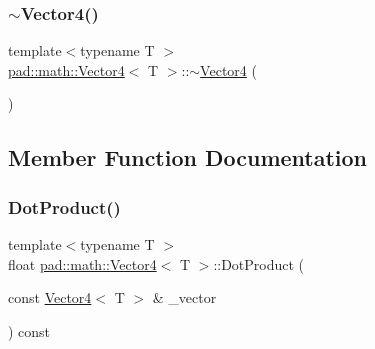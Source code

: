 \mbox{\label{structpad_1_1math_1_1_vector4_adf02f843943a3524de2add168b4d4903}} 
\subsubsection{\texorpdfstring{$\sim$\+Vector4()}{~Vector4()}}
{\footnotesize\ttfamily template$<$typename T $>$ \\
\mbox{\hyperlink{structpad_1_1math_1_1_vector4}{pad\+::math\+::\+Vector4}}$<$ T $>$\+::$\sim$\mbox{\hyperlink{structpad_1_1math_1_1_vector4}{Vector4}} (\begin{DoxyParamCaption}{ }\end{DoxyParamCaption})\hspace{0.3cm}{\ttfamily [default]}}



\subsection{Member Function Documentation}
\mbox{\label{structpad_1_1math_1_1_vector4_aa2bc23659e5331ea63c4135ff4ba0cc5}} 
\subsubsection{\texorpdfstring{Dot\+Product()}{DotProduct()}}
{\footnotesize\ttfamily template$<$typename T $>$ \\
float \mbox{\hyperlink{structpad_1_1math_1_1_vector4}{pad\+::math\+::\+Vector4}}$<$ T $>$\+::Dot\+Product (\begin{DoxyParamCaption}\item[{const \mbox{\hyperlink{structpad_1_1math_1_1_vector4}{Vector4}}$<$ T $>$ \&}]{\+\_\+vector }\end{DoxyParamCaption}) const}

\mbox{\label{structpad_1_1math_1_1_vector4_a60b73d235abc2a5948dccbe786de338f}} 
